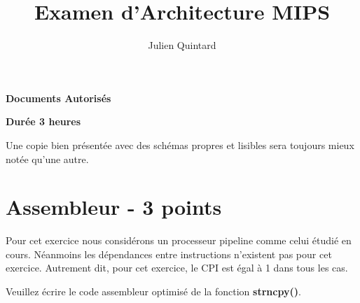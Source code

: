 
%
%



%
%


%
%

\title{Examen d'Architecture MIPS}

%
%

\author{\small{Julien Quintard}}

%
%



%
%

\maketitle

%
%

\begin{center}

\textbf{Documents Autoris\'es}

\textbf{Dur\'ee 3 heures}

\scriptsize{Une copie bien pr\'esent\'ee avec des sch\'emas propres et
	    lisibles sera toujours mieux not\'ee qu'une autre.}
\end{center}

%
%

%
%

\section{Assembleur - 3 points}

Pour cet exercice nous consid\'erons un processeur pipeline comme celui
\'etudi\'e en cours. N\'eanmoins les d\'ependances entre instructions
n'existent pas pour cet exercice. Autrement dit, pour cet exercice,
le CPI est \'egal \`a 1 dans tous les cas.

Veuillez \'ecrire le code assembleur optimis\'e de la fonction
\textbf{strncpy()}.

